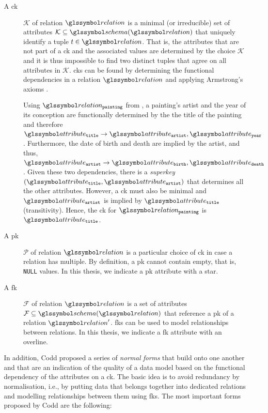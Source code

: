 \begin{description}
    \item[A \acrfull{ck}] $\mathcal{K}$ of relation $\relation$ is a minimal (or irreducible) set of attributes $\mathcal{K} \subseteq \schema(\relation)$ that uniquely identify a tuple $t \in \relation$. That is, the attributes that are not part of a \acrshort{ck} and the associated values are determined by the choice $\mathcal{K}$ and it is thus impossible to find two distinct tuples that agree on all attributes in $\mathcal{K}$. \acrshort{ck}s can be found by determining the functional dependencies in a relation $\relation$ and applying Armstrong's axioms \cite{Armstrong:1974Dependency}.
    
    Using $\relation_{\mathtt{painting}}$ from , a painting's artist and the year of its conception are functionally determined by the the title of the painting and therefore $\attribute_\mathtt{title} \rightarrow \attribute_{\mathtt{artist}},\attribute_{\mathtt{year}}$. Furthermore, the date of birth and death are implied by the artist, and thus, $\attribute_\mathtt{artist} \rightarrow \attribute_{\mathtt{birth}},\attribute_{\mathtt{death}}$. Given these two dependencies, there is a \emph{superkey} $(\attribute_\mathtt{title}, \attribute_{\mathtt{artist}})$ that determines all the other attributes. However, a \acrshort{ck} must also be minimal and $\attribute_{\mathtt{artist}}$ is implied by $\attribute_\mathtt{title}$ (transitivity). Hence, the \acrshort{ck} for $\relation_{\mathtt{painting}}$ is $\attribute_\mathtt{title}$.

    \item[A \acrfull{pk}] $\mathcal{P}$ of relation $\relation$ is a particular choice of \acrshort{ck} in case a relation has multiple. By definition, a \acrshort{pk} cannot contain empty, that is, \texttt{NULL} values. In this thesis, we indicate a \acrshort{pk} attribute with a star.
 
    \item[A \acrfull{fk}] $\mathcal{F}$ of relation $\relation$ is a set of attributes $\mathcal{F} \subseteq \schema(\relation)$ that reference a \acrshort{pk} of a relation $\relation^{\prime}$. \acrshort{fk}s can be used to model relationships between relations. In this thesis, we indicate a \acrshort{fk} attribute with an overline.
\end{description}

In addition, Codd proposed a series of \emph{normal forms} \cite{Codd:1970Relational,Codd:1972Further,Codd:1974Recent} that build onto one another and that are an indication of the quality of a data model based on the functional dependency of the attributes on a \acrshort{ck}. The basic idea is to avoid redundancy by normalisation, i.e., by putting data that belongs together into dedicated relations and modelling relationships between them using \acrshort{fk}s. The most important forms proposed by Codd are the following:

